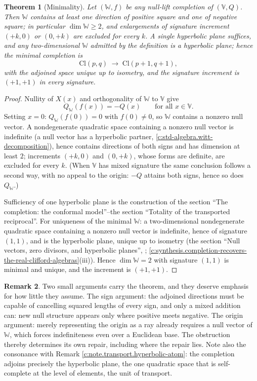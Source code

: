 \documentclass[11pt]{article}
\newtheorem{theorem}{Theorem}[section]
\theoremstyle{definition}
\newtheorem{remark}[theorem]{Remark}
\theoremstyle{plain}
\providecommand{\Cl}{}\renewcommand{\Cl}{\mathrm{Cl}}
\begin{document}
\begin{theorem}[Minimality]\label{c:transport.minimality}
Let $(\mathbb{W}, f)$ be any null-lift completion of $(\mathbb{V}, Q)$. Then $\mathbb{W}$ contains at least one direction of positive square and one of negative square; in particular $\dim \mathbb{W} \geq 2$, and enlargements of signature increment $(+k, 0)$ or $(0, +k)$ are excluded for every $k$. A single hyperbolic plane suffices, and any two-dimensional $\mathbb{W}$ admitted by the definition is a hyperbolic plane; hence the minimal completion is
\[
\Cl(p,q) \;\longrightarrow\; \Cl(p{+}1, q{+}1),
\]
with the adjoined space unique up to isometry, and the signature increment is $(+1,+1)$ in every signature.
\end{theorem}
\begin{proof}
Nullity of $X(x)$ and orthogonality of $\mathbb{W}$ to $\mathbb{V}$ give
\[
Q_{\mathbb{W}}(f(x)) = -Q(x) \qquad \text{for all } x \in \mathbb{V}.
\]
Setting $x = 0$: $Q_{\mathbb{W}}(f(0)) = 0$ with $f(0) \neq 0$, so $\mathbb{W}$ contains a nonzero null vector. A nondegenerate quadratic space containing a nonzero null vector is indefinite \cite{Lam2005} (a null vector has a hyperbolic partner, \ref{c:std-algebra.witt-decomposition}), hence contains directions of both signs and has dimension at least $2$; increments $(+k,0)$ and $(0,+k)$, whose forms are definite, are excluded for every $k$. (When $\mathbb{V}$ has mixed signature the same conclusion follows a second way, with no appeal to the origin: $-Q$ attains both signs, hence so does $Q_{\mathbb{W}}$.)

Sufficiency of one hyperbolic plane is the construction of the section ``The completion: the conformal model''--the section ``Totality of the transported reciprocal''. For uniqueness of the minimal $\mathbb{W}$: a two-dimensional nondegenerate quadratic space containing a nonzero null vector is indefinite, hence of signature $(1,1)$, and is the hyperbolic plane, unique up to isometry (the section ``Null vectors, zero divisors, and hyperbolic planes'', \cite{Lam2005}; \ref{c:synthesis.completion-recovers-the-real-clifford-algebras}(iii)). Hence $\dim \mathbb{W} = 2$ with signature $(1,1)$ is minimal and unique, and the increment is $(+1,+1)$.

\end{proof}

\begin{remark}\label{c:note.transport.signargument}
Two small arguments carry the theorem, and they deserve emphasis for how little they assume. The sign argument: the adjoined directions must be capable of cancelling squared lengths of every sign, and only a mixed addition can: new null structure appears only where positive meets negative. The origin argument: merely representing the origin as a ray already requires a null vector of $\mathbb{W}$, which forces indefiniteness even over a Euclidean base. The obstruction thereby determines its own repair, including where the repair lies. Note also the consonance with Remark \ref{c:note.transport.hyperbolic-atom}: the completion adjoins precisely the hyperbolic plane, the one quadratic space that is self-complete at the level of elements, the unit of transport.
\end{remark}
\end{document}
